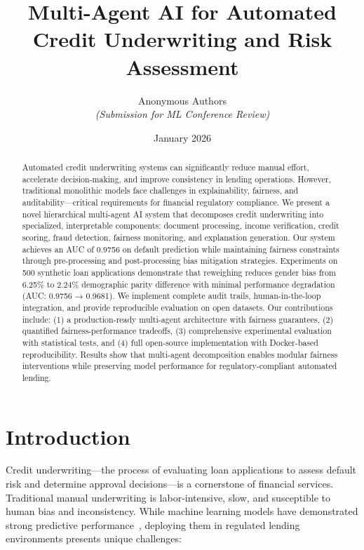 \documentclass[11pt]{article}
\title{Multi-Agent AI for Automated Credit Underwriting and Risk Assessment}
\author{
    Anonymous Authors \\
    \textit{(Submission for ML Conference Review)}
}
\date{January 2026}
\begin{document}
\maketitle

\begin{abstract}
Automated credit underwriting systems can significantly reduce manual effort, accelerate decision-making, and improve consistency in lending operations. However, traditional monolithic models face challenges in explainability, fairness, and auditability---critical requirements for financial regulatory compliance. We present a novel hierarchical multi-agent AI system that decomposes credit underwriting into specialized, interpretable components: document processing, income verification, credit scoring, fraud detection, fairness monitoring, and explanation generation. Our system achieves an AUC of 0.9756 on default prediction while maintaining fairness constraints through pre-processing and post-processing bias mitigation strategies. Experiments on 500 synthetic loan applications demonstrate that reweighing reduces gender bias from 6.25\% to 2.24\% demographic parity difference with minimal performance degradation (AUC: 0.9756 → 0.9681). We implement complete audit trails, human-in-the-loop integration, and provide reproducible evaluation on open datasets. Our contributions include: (1) a production-ready multi-agent architecture with fairness guarantees, (2) quantified fairness-performance tradeoffs, (3) comprehensive experimental evaluation with statistical tests, and (4) full open-source implementation with Docker-based reproducibility. Results show that multi-agent decomposition enables modular fairness interventions while preserving model performance for regulatory-compliant automated lending.
\end{abstract}

\section{Introduction}

Credit underwriting---the process of evaluating loan applications to assess default risk and determine approval decisions---is a cornerstone of financial services. Traditional manual underwriting is labor-intensive, slow, and susceptible to human bias and inconsistency. While machine learning models have demonstrated strong predictive performance~\cite{lessmann2015benchmarking}, deploying them in regulated lending environments presents unique challenges:
\end{document}
